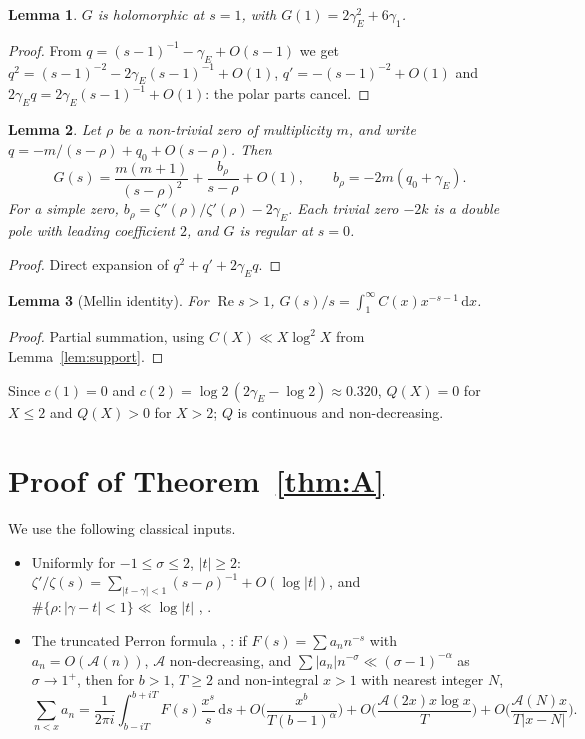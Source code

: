 \documentclass[11pt]{amsart}
\newtheorem{lemma}{Lemma}[section]
\theoremstyle{remark}
\theoremstyle{definition}
\newcommand{\gE}{\gamma_E}
\newcommand{\dd}{\,\mathrm{d}}
\renewcommand{\Re}{\operatorname{Re}}
\begin{document}
\begin{lemma}\label{lem:one}
$G$ is holomorphic at $s=1$, with $G(1)=2\gE^2+6\gamma_1$.
\end{lemma}
\begin{proof}
From $q=(s-1)^{-1}-\gE+O(s-1)$ we get $q^2=(s-1)^{-2}-2\gE(s-1)^{-1}+O(1)$, $q'=-(s-1)^{-2}+O(1)$ and $2\gE q=2\gE(s-1)^{-1}+O(1)$: the polar parts cancel.
\end{proof}

\begin{lemma}\label{lem:poles}
Let $\rho$ be a non-trivial zero of multiplicity $m$, and write $q=-m/(s-\rho)+q_0+O(s-\rho)$. Then
\[
G(s)=\frac{m(m+1)}{(s-\rho)^2}+\frac{b_\rho}{s-\rho}+O(1),\qquad b_\rho=-2m(q_0+\gE).
\]
For a simple zero, $b_\rho=\zeta''(\rho)/\zeta'(\rho)-2\gE$. Each trivial zero $-2k$ is a double pole with leading coefficient $2$, and $G$ is regular at $s=0$.
\end{lemma}
\begin{proof}
Direct expansion of $q^2+q'+2\gE q$.
\end{proof}

\begin{lemma}[Mellin identity]\label{lem:mellin}
For $\Re s>1$, $G(s)/s=\int_1^\infty C(x)x^{-s-1}\dd x$.
\end{lemma}
\begin{proof}
Partial summation, using $C(X)\ll X\log^2X$ from Lemma~\ref{lem:support}.
\end{proof}

Since $c(1)=0$ and $c(2)=\log2\,(2\gE-\log2)\approx0.320$, $Q(X)=0$ for $X\le2$ and $Q(X)>0$ for $X>2$; $Q$ is continuous and non-decreasing.

\section{Proof of Theorem~\ref{thm:A}}\label{sec:A}

We use the following classical inputs.
\begin{itemize}
\item[(F1)] Uniformly for $-1\le\sigma\le2$, $|t|\ge2$: $\zeta'/\zeta(s)=\sum_{|t-\gamma|<1}(s-\rho)^{-1}+O(\log|t|)$, and $\#\{\rho:|\gamma-t|<1\}\ll\log|t|$ \cite[Thms.~9.2, 9.6(A)]{Tit86}, \cite[Ch.~15]{Dav00}.
\item[(F2)] The truncated Perron formula \cite[Lemma~3.12]{Tit86}, \cite[Cor.~5.3]{MV07}: if $F(s)=\sum a_nn^{-s}$ with $a_n=O(\mathcal A(n))$, $\mathcal A$ non-decreasing, and $\sum|a_n|n^{-\sigma}\ll(\sigma-1)^{-\alpha}$ as $\sigma\to1^+$, then for $b>1$, $T\ge2$ and non-integral $x>1$ with nearest integer $N$,
\[
\sum_{n<x}a_n=\frac1{2\pi i}\int_{b-iT}^{b+iT}F(s)\frac{x^s}{s}\dd s+O\Big(\frac{x^b}{T(b-1)^\alpha}\Big)+O\Big(\frac{\mathcal A(2x)x\log x}{T}\Big)+O\Big(\frac{\mathcal A(N)x}{T|x-N|}\Big).
\]
\end{itemize}
\end{document}
